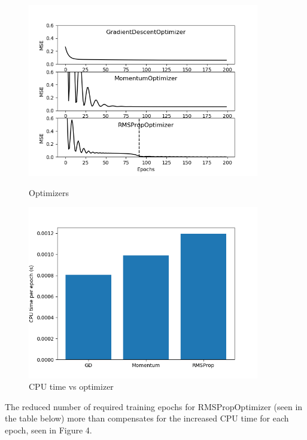 \documentclass[11pt]{article}
\begin{document}
\begin{enumerate}
\begin{figure}[h!]
    \centering
    \begin{minipage}{0.45\textwidth}
        \centering
        \includegraphics[width=0.9\textwidth]{q1b-2b} %
        \caption{Optimizers}
    \end{minipage}\hfill
    \begin{minipage}{0.45\textwidth}
        \centering
        \includegraphics[width=0.9\textwidth]{q1b-3_cpu-time} %
        \caption{CPU time vs optimizer}
    \end{minipage}
\end{figure}

The reduced number of required training epochs for RMSPropOptimizer (seen in the table below) more than compensates for the increased CPU time for each epoch, seen in Figure 4.\newline




\end{enumerate}
\end{document}
